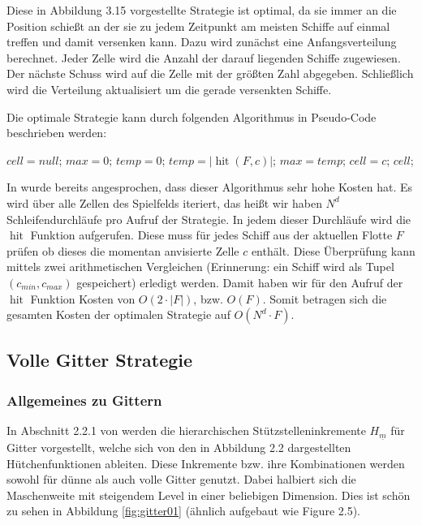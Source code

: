 \documentclass[a4paper,12pt]{llncs}
\numberwithin{equation}{section}
\DeclareMathOperator{\hit}{hit}
\begin{document}
Diese in \cite{M13} Abbildung 3.15 vorgestellte Strategie ist optimal, da sie immer an die Position schießt an der sie zu jedem Zeitpunkt am meisten Schiffe auf einmal treffen und damit versenken kann. Dazu wird zunächst eine Anfangsverteilung berechnet. Jeder Zelle wird die Anzahl der darauf liegenden Schiffe zugewiesen. Der nächste Schuss wird auf die Zelle mit der größten Zahl abgegeben. Schließlich wird die Verteilung aktualisiert um die gerade versenkten Schiffe.

Die optimale Strategie kann durch folgenden Algorithmus in Pseudo-Code beschrieben werden:

\begin{tcolorbox}
	\begin{algorithmic}
		\State $cell = null$;
		\State $max = 0$;
		\State $temp = 0$;
		\State $temp=\left|\hit(F,c)\right|$;
		\State $max=temp$;
		\State $cell = c$;
		\EndIf
		\EndFor
		\State \Return $cell$;
		\EndFunction
	\end{algorithmic}
\end{tcolorbox}

In \cite{M13} wurde bereits angesprochen, dass dieser Algorithmus sehr hohe Kosten hat. Es wird über alle Zellen des Spielfelds iteriert, das heißt wir haben $N^d$ Schleifendurchläufe pro Aufruf der Strategie. In jedem dieser Durchläufe wird die $\hit$ Funktion aufgerufen. Diese muss für jedes Schiff aus der aktuellen Flotte $F$ prüfen ob dieses die momentan anvisierte Zelle $c$ enthält. Diese Überprüfung kann mittels zwei arithmetischen Vergleichen (Erinnerung: ein Schiff wird als Tupel $(c_{min},c_{max})$ gespeichert) erledigt werden. Damit haben wir für den Aufruf der $\hit$ Funktion Kosten von $O(2\cdot |F|)$, bzw. $O(F)$. Somit betragen sich die gesamten Kosten der optimalen Strategie auf $O(N^d\cdot F)$. 

\subsection{Volle Gitter Strategie}

\subsubsection{Allgemeines zu Gittern}

In Abschnitt 2.2.1 von \cite{M13} werden die hierarchischen Stützstelleninkremente $H_{\underline{m}}$ für Gitter vorgestellt, welche sich von den in \cite{M13} Abbildung 2.2 dargestellten Hütchenfunktionen ableiten. Diese Inkremente bzw. ihre Kombinationen werden sowohl für dünne als auch volle Gitter genutzt. Dabei halbiert sich die Maschenweite mit steigendem Level in einer beliebigen Dimension. Dies ist schön zu sehen in Abbildung \ref{fig:gitter01} (ähnlich aufgebaut wie \cite{P10} Figure 2.5).
\end{document}
